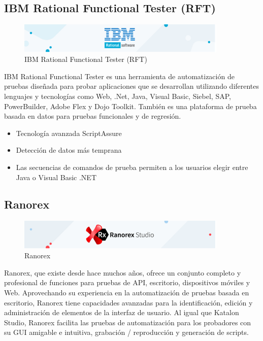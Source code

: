 \documentclass[12pt,letterpaper]{article}
\begin{document}
\subsection{IBM Rational Functional Tester (RFT)}
\begin{figure}[h]
    \begin{center}
    \includegraphics[width=10cm]{./Imagenes/image6.png}
    \caption{IBM Rational Functional Tester (RFT)}
    \label{rg6}
    \end{center}
    \end{figure}
IBM Rational Functional Tester es una herramienta de 
automatización de pruebas diseñada para probar aplicaciones
 que se desarrollan utilizando diferentes lenguajes y tecnologías
  como Web, .Net, Java, Visual Basic, Siebel, SAP, PowerBuilder, Adobe
   Flex y Dojo Toolkit. También es una plataforma de prueba basada en 
   datos para pruebas funcionales y de regresión.
\begin{itemize}
    \item Tecnología avanzada ScriptAssure
    \item Detección de datos más temprana
    \item Las secuencias de comandos de prueba permiten a los usuarios elegir entre Java o Visual Basic .NET

\end{itemize}
\subsection{Ranorex}
\begin{figure}[h]
    \begin{center}
    \includegraphics[width=10cm]{./Imagenes/image7.png}
    \caption{Ranorex}
    \label{rg7}
    \end{center}
    \end{figure}
Ranorex, que existe desde hace muchos años, ofrece un conjunto completo y profesional de funciones para pruebas de API, escritorio, dispositivos móviles y Web. Aprovechando su experiencia en la automatización de pruebas basada en escritorio, Ranorex tiene capacidades avanzadas para la identificación, edición y administración de elementos de la interfaz de usuario.
Al igual que Katalon Studio, Ranorex facilita las pruebas de automatización para los probadores con su GUI amigable e intuitiva, grabación / reproducción y generación de scripts.
\end{document}
